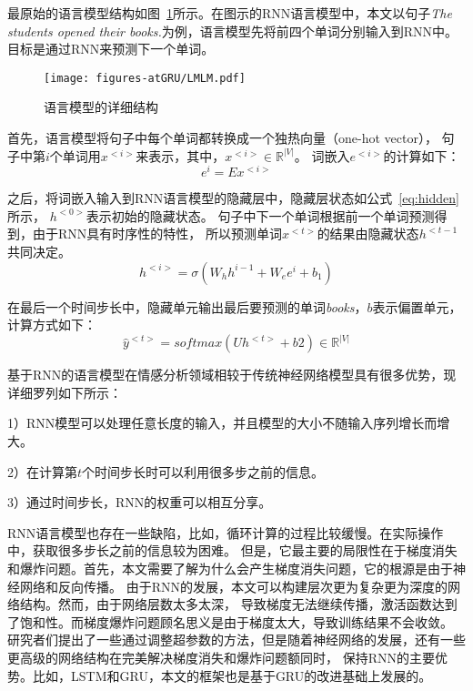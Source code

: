 最原始的语言模型结构如图~\ref{fig:LMLM}所示。在图示的RNN语言模型中，本文以句子\emph{The students opened their books.}为例，语言模型先将前四个单词分别输入到RNN中。
目标是通过RNN来预测下一个单词。

\begin{figure}[h!]
	\centering
	\texttt{[image: figures-atGRU/LMLM.pdf]}
	\caption{语言模型的详细结构}
	\label{fig:LMLM}
\end{figure}

首先，语言模型将句子中每个单词都转换成一个独热向量（one-hot vector），
句子中第${i}$个单词用${x^{<i>}}$来表示，其中，${x^{<i>} \in \mathbb{R}^{\left | V \right |}}$。
词嵌入${e^{<i>}}$的计算如下：
\begin{equation}
e^{i}=Ex^{<i>}
\end{equation}

之后，将词嵌入输入到RNN语言模型的隐藏层中，隐藏层状态如公式~\ref{eq:hidden}所示，
${h^{<0>}}$表示初始的隐藏状态。
句子中下一个单词根据前一个单词预测得到，由于RNN具有时序性的特性，
所以预测单词${x^{<t>}}$的结果由隐藏状态${h^{<t-1}}$共同决定。
\begin{equation}
h^{<i>}=\sigma \left ( W_{h}h^{i-1} +W_{e}e^{i}+b_{1}\right )
\label{eq:hidden}
\end{equation}

在最后一个时间步长中，隐藏单元输出最后要预测的单词\emph{books}，${b}$表示偏置单元，计算方式如下：
\begin{equation}
\widehat{y}^{<t>}=softmax\left (  Uh^{<t>}+b2\right ) \in \mathbb{R}^{\left | V \right |}
\end{equation}

基于RNN的语言模型在情感分析领域相较于传统神经网络模型具有很多优势，现详细罗列如下所示：

1）RNN模型可以处理任意长度的输入，并且模型的大小不随输入序列增长而增大。

2）在计算第${t}$个时间步长时可以利用很多步之前的信息。

3）通过时间步长，RNN的权重可以相互分享。

RNN语言模型也存在一些缺陷，比如，循环计算的过程比较缓慢。在实际操作中，获取很多步长之前的信息较为困难。
但是，它最主要的局限性在于梯度消失和爆炸问题。首先，本文需要了解为什么会产生梯度消失问题，它的根源是由于神经网络和反向传播。
由于RNN的发展，本文可以构建层次更为复杂更为深度的网络结构。然而，由于网络层数太多太深，
导致梯度无法继续传播，激活函数达到了饱和性。而梯度爆炸问题顾名思义是由于梯度太大，导致训练结果不会收敛。
研究者们提出了一些通过调整超参数的方法，但是随着神经网络的发展，还有一些更高级的网络结构在完美解决梯度消失和爆炸问题额同时，
保持RNN的主要优势。比如，LSTM和GRU，本文的框架也是基于GRU的改进基础上发展的。

